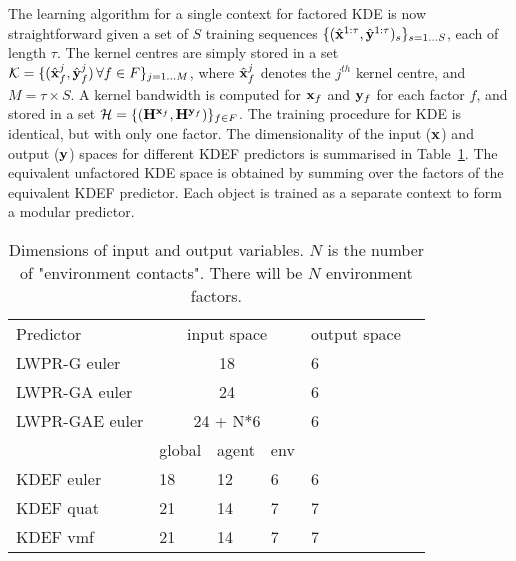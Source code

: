 
The learning algorithm for a single context for factored KDE is now straightforward given a set of $S$ training sequences $\{ (\hat{\mathbf{x}}^{1:\tau} , \hat{\mathbf{y}}^{1:\tau})_s \}_{s = 1 \ldots S}$, each of length $\tau$. The kernel centres are simply stored in a set $\mathcal{K} = \{ ( \hat{\mathbf{x}}^j_f ,  \hat{\mathbf{y}}^j_f ) \, \forall f \in F \}_{ j = 1 \ldots M}$, where $\hat{\mathbf{x}}^j_f$ denotes the $j^{th}$ kernel centre, and $M= \tau \times S$. A kernel bandwidth is computed for $\mathbf{x}_f$ and $\mathbf{y}_f$ for each factor $f$, and stored in a set $\mathcal{H} = \{ (\mathbf{H}^{\mathbf{x}_f},  \mathbf{H}^{\mathbf{y}_f} ) \}_{f \in F}$. The training procedure for KDE is identical, but with only one factor. The dimensionality of the input ($\mathbf{x}$) and output ($\mathbf{y}$) spaces for different KDEF predictors is summarised in Table~\ref{tab:InpOutSpace}. The equivalent unfactored KDE space is obtained by summing over the factors of the equivalent KDEF predictor. Each object is trained as a separate context to form a modular predictor.

\begin{table}[b]
\begin{center}
\begin{tabular}{|l|l|l|l|l|l|}
\cline{1-5}
Predictor & \multicolumn{3}{|c|}{input space } & output space \\
\cline{1-5}
LWPR-G euler & \multicolumn{3}{|c|}{18} & 6 \\
LWPR-GA euler & \multicolumn{3}{|c|}{24} & 6 \\
LWPR-GAE euler & \multicolumn{3}{|c|}{24 + N*6} & 6 \\
\cline{1-5}
\cline{2-4}
 & global & agent & env & \\
\cline{1-5}
KDEF euler & 18 & 12 & 6 & 6 \\
KDEF quat & 21 & 14 & 7 & 7 \\
KDEF vmf & 21 & 14 & 7 & 7 \\
\cline{1-5}
\end{tabular}
\end{center}
\caption[Input/output space]{Dimensions of input and output variables. $N$ is the number of "environment contacts". There will be $N$ environment factors.}\label{tab:InpOutSpace}
\end{table}


